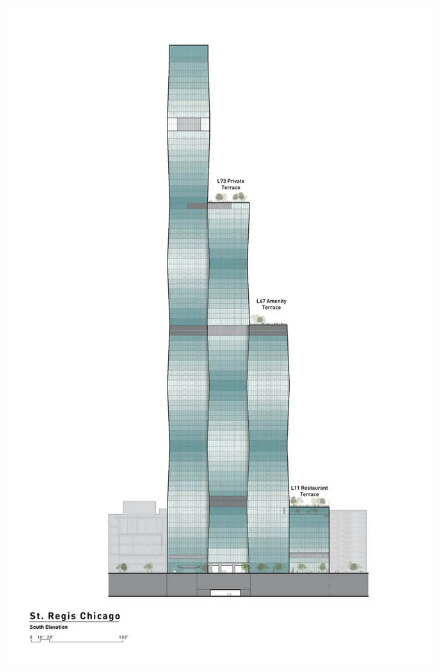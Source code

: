 \begin{figure}[H]
\begin{minipage}{0.3\textwidth}
 \includegraphics[width=\textwidth]{Graphics/Images/image_8.jpg}
 \caption{ }
 \label{fig:8}
\end{minipage}
\begin{minipage}{0.3\textwidth}

\end{minipage}
\end{figure}
